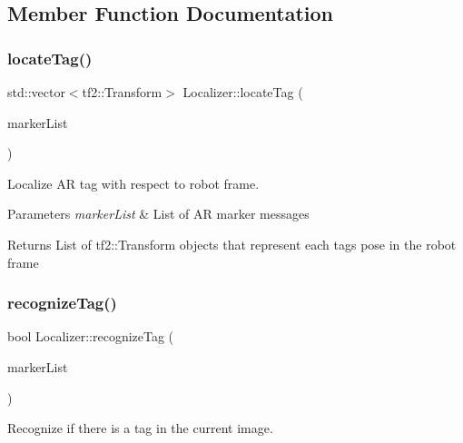 \subsection{Member Function Documentation}
\mbox{\label{classLocalizer_a81d7f1b936ab815a58f7432c2b389ebc}} 
\subsubsection{\texorpdfstring{locate\+Tag()}{locateTag()}}
{\footnotesize\ttfamily std\+::vector$<$tf2\+::\+Transform$>$ Localizer\+::locate\+Tag (\begin{DoxyParamCaption}\item[{std\+::vector$<$ ar\+\_\+track\+\_\+alvar\+\_\+msgs\+::\+Alvar\+Marker $>$}]{marker\+List }\end{DoxyParamCaption})}



Localize AR tag with respect to robot frame. 


\begin{DoxyParams}{Parameters}
{\em marker\+List} & List of AR marker messages \\
\hline
\end{DoxyParams}
\begin{DoxyReturn}{Returns}
List of tf2\+::\+Transform objects that represent each tag\textquotesingle{}s pose in the robot frame 
\end{DoxyReturn}
\mbox{\label{classLocalizer_a02a645fc1f78ab10d1285fd494d8532a}} 
\subsubsection{\texorpdfstring{recognize\+Tag()}{recognizeTag()}}
{\footnotesize\ttfamily bool Localizer\+::recognize\+Tag (\begin{DoxyParamCaption}\item[{std\+::vector$<$ ar\+\_\+track\+\_\+alvar\+\_\+msgs\+::\+Alvar\+Marker $>$}]{marker\+List }\end{DoxyParamCaption})}



Recognize if there is a tag in the current image. 


